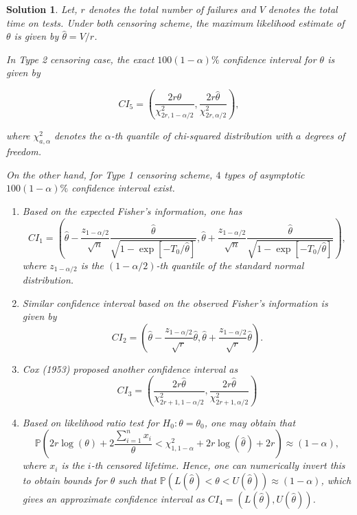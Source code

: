 \documentclass[12pt]{article}
\theoremstyle{problemstyle}
\newtheorem*{solution*}{Solution}
\newcommand{\prob}{\mathbb{P}}
\begin{document}
\begin{solution*}
    Let, $r$ denotes the total number of failures and $V$ denotes the total time on tests. Under both censoring scheme, the maximum likelihood estimate of $\theta$ is given by $\widehat{\theta} = V/r$. 

    In Type 2 censoring case, the exact $100(1-\alpha)\%$ confidence interval for $\theta$ is given by 

    $$
    CI_5 = \left( \dfrac{2r\widehat{\theta}}{\chi^2_{2r, 1-\alpha/2}}, \dfrac{2r\widehat{\theta}}{\chi^2_{2r, \alpha/2}} \right),
    $$

    \noindent where $\chi^2_{a, \alpha}$ denotes the $\alpha$-th quantile of chi-squared distribution with $a$ degrees of freedom. 

    On the other hand, for Type 1 censoring scheme, $4$ types of asymptotic $100(1-\alpha)\%$ confidence interval exist.

    \begin{enumerate}
        \item Based on the expected Fisher's information, one has 
        $$
        CI_1 = \left( \widehat{\theta} - \dfrac{z_{1 - \alpha/2}}{\sqrt{n}} \dfrac{\widehat{\theta}}{\sqrt{1 - \exp\left[ -T_0/\widehat{\theta} \right]}}, \widehat{\theta} + \dfrac{z_{1 - \alpha/2}}{\sqrt{n}} \dfrac{\widehat{\theta}}{\sqrt{1 - \exp\left[ -T_0/\widehat{\theta} \right]}} \right),
        $$
        \noindent where $z_{1 - \alpha/2}$ is the $(1 - \alpha/2)$-th quantile of the standard normal distribution.
        \item Similar confidence interval based on the observed Fisher's information is given by 
        $$
        CI_2 = \left( \widehat{\theta} - \dfrac{z_{1 - \alpha/2}}{\sqrt{r}} \widehat{\theta} , \widehat{\theta} + \dfrac{z_{1 - \alpha/2}}{\sqrt{r}} \widehat{\theta} \right).
        $$
        \item Cox (1953) proposed another confidence interval as 
        $$
        CI_3 = \left( \dfrac{2r\widehat{\theta}}{\chi^2_{2r+1, 1-\alpha/2}}, \dfrac{2r\widehat{\theta}}{\chi^2_{2r+1, \alpha/2}} \right)
        $$
        \item Based on likelihood ratio test for $H_0: \theta = \theta_0$, one may obtain that 
        $$
        \prob\left( 2r \log({\theta}) + 2\dfrac{\sum_{i=1}^n x_i}{{\theta}} < \chi^2_{1, 1-\alpha} + 2r\log(\widehat{\theta}) + 2r \right) \approx (1 - \alpha),
        $$
        \noindent where $x_i$ is the $i$-th censored lifetime. Hence, one can numerically invert this to obtain bounds for $\theta$ such that $\prob(L(\widehat{\theta})< \theta < U(\widehat{\theta})) \approx (1 - \alpha)$, which gives an approximate confidence interval as $CI_4 = (L(\widehat{\theta}), U(\widehat{\theta}))$.
    \end{enumerate}


\end{solution*}
\end{document}
